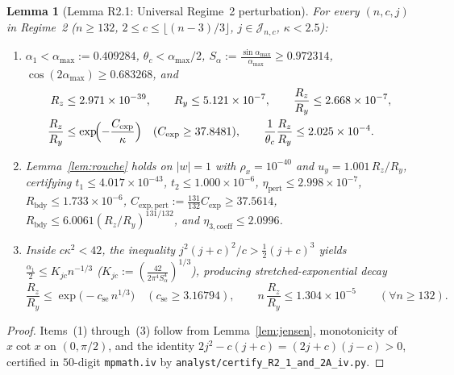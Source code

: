 \documentclass[10pt]{article}
\numberwithin{equation}{section}
\theoremstyle{plain}
\newtheorem{lemma}[theorem]{Lemma}
\theoremstyle{definition}
\newcommand{\1}{\mathbf{1}}
\newcommand{\code}[1]{\texttt{#1}}
\begin{document}
\begin{lemma}[Lemma R2.1: Universal Regime~2 perturbation]\label{lem:R2-1}
For every $(n, c, j)$ in Regime~2 ($n \ge 132$, $2 \le c \le \lfloor (n - 3)/3 \rfloor$, $j \in \mathcal{J}_{n,c}$, $\kappa < 2.5$):
\begin{enumerate}[label=\textup{(\arabic*)}]
    \item $\alpha_1 < \alpha_{\max} := 0.409284$, $\theta_c < \alpha_{\max}/2$, $S_\alpha := \frac{\sin\alpha_{\max}}{\alpha_{\max}} \ge 0.972314$, $\cos(2\alpha_{\max}) \ge 0.683268$, and
    \begin{subequations}\label{eq:R21-bounds}
    \begin{align}
    R_z &\le 2.971 \times 10^{-39}, \qquad R_y \le 5.121 \times 10^{-7}, \qquad \frac{R_z}{R_y} \le 2.668 \times 10^{-7}, \\
    \frac{R_z}{R_y} &\le \exp\!\Bigl(-\frac{C_{\exp}}{\kappa}\Bigr) \quad (C_{\exp} \ge 37.8481),
    \qquad \frac{1}{\theta_c}\frac{R_z}{R_y} \le 2.025 \times 10^{-4}.
    \end{align}
    \end{subequations}
    \item Lemma~\ref{lem:rouche} holds on $|w| = 1$ with $\rho_x = 10^{-40}$ and $u_y = 1.001\, R_z/R_y$, certifying $t_1 \le 4.017 \times 10^{-43}$, $t_2 \le 1.000 \times 10^{-6}$, $\eta_{\mathrm{pert}} \le 2.998 \times 10^{-7}$, $R_{\mathrm{bdy}} \le 1.733 \times 10^{-6}$, $C_{\mathrm{exp,pert}} := \frac{131}{132} C_{\exp} \ge 37.5614$, $R_{\mathrm{bdy}} \le 6.0061 (R_z/R_y)^{131/132}$, and $\eta_{3,\mathrm{coeff}} \le 2.0996$.
    \item Inside $c\kappa^2 < 42$, the inequality $j^2(j + c)^2/c > \frac{1}{2}(j + c)^3$ yields $\frac{\alpha_1}{2} \le K_{jc} n^{-1/3}$ ($K_{jc} := (\frac{42}{2\pi^4 S_\alpha^4})^{1/3}$), producing stretched-exponential decay
    \begin{equation}\label{eq:stretched-exp}
    \frac{R_z}{R_y} \le \exp\bigl(-c_{\mathrm{se}}\, n^{1/3}\bigr) \quad (c_{\mathrm{se}} \ge 3.16794),
    \qquad n\,\frac{R_z}{R_y} \le 1.304 \times 10^{-5} \qquad (\forall n \ge 132).
    \end{equation}
\end{enumerate}
\end{lemma}

\begin{proof}
Items~(1) through~(3) follow from Lemma~\ref{lem:jensen}, monotonicity of $x\cot x$ on $(0, \pi/2)$, and the identity $2j^2 - c(j+c) = (2j+c)(j-c) > 0$, certified in $50$-digit \code{mpmath.iv} by \code{analyst/certify\_R2\_1\_and\_2A\_iv.py}.
\end{proof}
\end{document}
